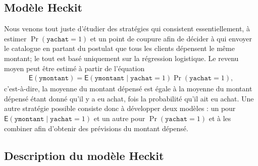 \documentclass[
  11pt,
  letterpaper,
]{scrbook}
\theoremstyle{definition}
\theoremstyle{remark}
\begin{document}
\hypertarget{moduxe8le-heckit}{%
\subsection{Modèle Heckit}\label{moduxe8le-heckit}}

Nous venons tout juste d'étudier des stratégies qui consistent
essentiellement, à estimer \(\Pr(\texttt{yachat}=1)\) et un point de
coupure afin de décider à qui envoyer le catalogue en partant du
postulat que tous les clients dépensent le même montant; le tout est
basé uniquement sur la régression logistique. Le revenu moyen peut être
estimé à partir de l'équation \begin{align*}
\mathsf{E}(\texttt{ymontant}) = \mathsf{E}(\texttt{ymontant} \mid \texttt{yachat}=1) \Pr(\texttt{yachat
}=1),
\end{align*} c'est-à-dire, la moyenne du montant dépensé est égale à la
moyenne du montant dépensé étant donné qu'il y a eu achat, fois la
probabilité qu'il ait eu achat. Une autre stratégie possible consiste
donc à développer deux modèles : un pour
\(\mathsf{E}(\texttt{ymontant} \mid \texttt{yachat}=1)\) et un autre
pour \(\Pr(\texttt{yachat}=1)\) et à les combiner afin d'obtenir des
prévisions du montant dépensé.

\hypertarget{description-du-moduxe8le-heckit}{%
\subsection*{Description du modèle
Heckit}\label{description-du-moduxe8le-heckit}}
\end{document}
